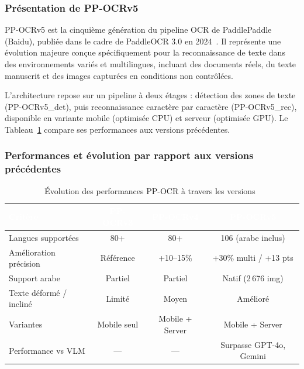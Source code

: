 \subsubsection{Présentation de PP-OCRv5}

PP-OCRv5 est la cinquième génération du pipeline OCR de PaddlePaddle (Baidu), publiée dans le cadre de PaddleOCR 3.0 en 2024~\cite{paddlepaddle_hf}. Il représente une évolution majeure conçue spécifiquement pour la reconnaissance de texte dans des environnements variés et multilingues, incluant des documents réels, du texte manuscrit et des images capturées en conditions non contrôlées.

L'architecture repose sur un pipeline à deux étages : détection des zones de texte (PP-OCRv5\_det), puis reconnaissance caractère par caractère (PP-OCRv5\_rec), disponible en variante mobile (optimisée CPU) et serveur (optimisée GPU). Le Tableau~\ref{tab:pp-ocr-evolution} compare ses performances aux versions précédentes.

\subsubsection{Performances et évolution par rapport aux versions précédentes}

\begin{table}[H]
  \centering
  \small
  \begin{tabular}{|l|c|c|c|}
    \toprule
    \rowcolor{bleu_principal}
    \textcolor{white}{\textbf{Critère}} & \textcolor{white}{\textbf{PP-OCRv3}} & \textcolor{white}{\textbf{PP-OCRv4}} & \textcolor{white}{\textbf{PP-OCRv5}} \\
    \midrule
    Langues supportées & 80+ & 80+ & 106 (arabe inclus) \\
    \midrule
    \rowcolor{gris_leger}
    Amélioration précision & Référence & +10--15\% & +30\% multi / +13 pts \\
    \midrule
    Support arabe & Partiel & Partiel & Natif (2\,676 img) \\
    \midrule
    \rowcolor{gris_leger}
    Texte déformé / incliné & Limité & Moyen & Amélioré \\
    \midrule
    Variantes & Mobile seul & Mobile + Server & Mobile + Server \\
    \midrule
    \rowcolor{gris_leger}
    Performance vs VLM & --- & --- & Surpasse GPT-4o, Gemini \\
    \bottomrule
  \end{tabular}
  \caption{Évolution des performances PP-OCR à travers les versions~\cite{paddlepaddle_hf}}
  \label{tab:pp-ocr-evolution}
\end{table}

